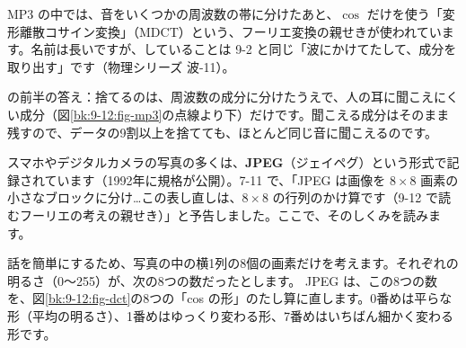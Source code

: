 
MP3 の中では、音をいくつかの周波数の帯に分けたあと、$\cos$ だけを使う「変形離散コサイン変換」（MDCT）という、フーリエ変換の親せきが使われています。名前は長いですが、していることは 9-2 と同じ「波にかけてたして、成分を取り出す」です（物理シリーズ 波-11）。

\bkhatenaref の前半の答え：捨てるのは、周波数の成分に分けたうえで、人の耳に聞こえにくい成分（図\ref{bk:9-12:fig-mp3}の点線より下）だけです。聞こえる成分はそのまま残すので、データの9割以上を捨てても、ほとんど同じ音に聞こえるのです。


\label{bk:9-12:jpeg}スマホやデジタルカメラの写真の多くは、\textbf{JPEG}（ジェイペグ）という形式で記録されています（1992年に規格が公開）。7-11 で、「JPEG は画像を $8\times8$ 画素の小さなブロックに分け…この表し直しは、$8\times8$ の行列のかけ算です（9-12 で読むフーリエの考えの親せき）」と予告しました。ここで、そのしくみを読みます。

話を簡単にするため、写真の中の横1列の8個の画素だけを考えます。それぞれの明るさ（0〜255）が、次の8つの数だったとします。
JPEG は、この8つの数を、図\ref{bk:9-12:fig-dct}の8つの「cos の形」のたし算に直します。0番めは平らな形（平均の明るさ）、1番めはゆっくり変わる形、7番めはいちばん細かく変わる形です。

\begin{bkfigure}
\label{bk:9-12:fig-dct}
\end{bkfigure}

